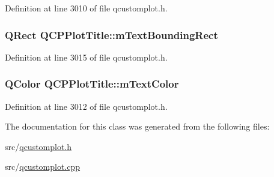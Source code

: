 Definition at line 3010 of file qcustomplot.\-h.

\hypertarget{class_q_c_p_plot_title_a7178a0f6c1e633c144c17b4de4e0b840}{
\subsubsection[{m\-Text\-Bounding\-Rect}]{\setlength{\rightskip}{0pt plus 5cm}Q\-Rect Q\-C\-P\-Plot\-Title\-::m\-Text\-Bounding\-Rect\hspace{0.3cm}{\ttfamily [protected]}}}\label{class_q_c_p_plot_title_a7178a0f6c1e633c144c17b4de4e0b840}


Definition at line 3015 of file qcustomplot.\-h.

\hypertarget{class_q_c_p_plot_title_a5d7f834d6522c1a72fb0682c0b7ebe13}{
\subsubsection[{m\-Text\-Color}]{\setlength{\rightskip}{0pt plus 5cm}Q\-Color Q\-C\-P\-Plot\-Title\-::m\-Text\-Color\hspace{0.3cm}{\ttfamily [protected]}}}\label{class_q_c_p_plot_title_a5d7f834d6522c1a72fb0682c0b7ebe13}


Definition at line 3012 of file qcustomplot.\-h.



The documentation for this class was generated from the following files\-:\begin{DoxyCompactItemize}
\item 
src/\hyperlink{qcustomplot_8h}{qcustomplot.\-h}\item 
src/\hyperlink{qcustomplot_8cpp}{qcustomplot.\-cpp}\end{DoxyCompactItemize}
